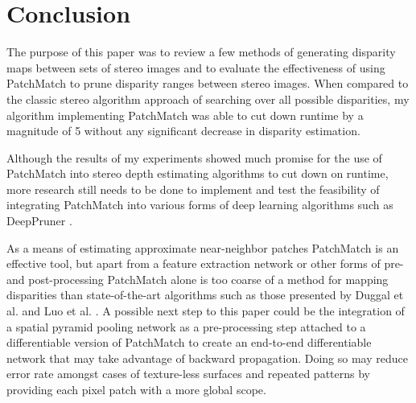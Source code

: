 \documentclass{article}
\begin{document}
\section{Conclusion}
\label{conclusion}
The purpose of this paper was to review a few methods of generating disparity maps between sets of stereo images and to evaluate the effectiveness of using PatchMatch \citep{barnes2009patchmatch} to prune disparity ranges between stereo images. When compared to the classic stereo algorithm approach of searching over all possible disparities, my algorithm implementing PatchMatch was able to cut down runtime by a magnitude of 5 without any significant decrease in disparity estimation.

Although the results of my experiments showed much promise for the use of PatchMatch \citep{barnes2009patchmatch} into stereo depth estimating algorithms to cut down on runtime, more research still needs to be done to implement and test the feasibility of integrating PatchMatch into various forms of deep learning algorithms such as DeepPruner \citep{duggal2019deeppruner}.

As a means of estimating approximate near-neighbor patches PatchMatch \citep{barnes2009patchmatch} is an effective tool, but apart from a feature extraction network or other forms of pre- and post-processing PatchMatch alone is too coarse of a method for mapping disparities than state-of-the-art algorithms such as those presented by Duggal et al. \citep{duggal2019deeppruner} and Luo et al. \citep{luo2016efficient}. A possible next step to this paper could be the integration of a spatial pyramid pooling network as a pre-processing step attached to a differentiable version of PatchMatch to create an end-to-end differentiable network that may take advantage of backward propagation. Doing so may reduce error rate amongst cases of texture-less surfaces and repeated patterns by providing each pixel patch with a more global scope.



\end{document}
